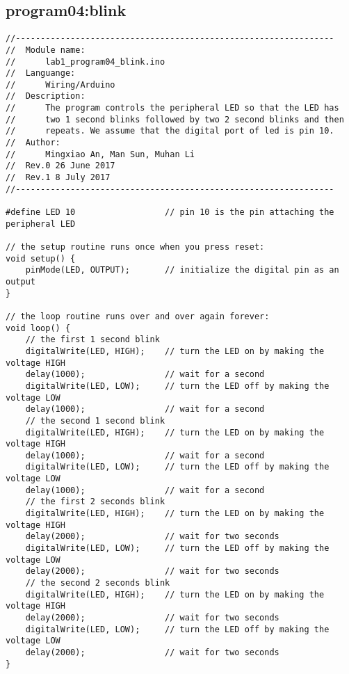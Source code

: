 \subsection{program04:blink}
\begin{verbatim}
//----------------------------------------------------------------
//  Module name:
//      lab1_program04_blink.ino
//  Languange:
//      Wiring/Arduino
//  Description:
//      The program controls the peripheral LED so that the LED has 
//      two 1 second blinks followed by two 2 second blinks and then
//      repeats. We assume that the digital port of led is pin 10.
//  Author:
//      Mingxiao An, Man Sun, Muhan Li
//  Rev.0 26 June 2017
//  Rev.1 8 July 2017
//----------------------------------------------------------------

#define LED 10                  // pin 10 is the pin attaching the peripheral LED

// the setup routine runs once when you press reset:
void setup() {
    pinMode(LED, OUTPUT);       // initialize the digital pin as an output
}

// the loop routine runs over and over again forever:
void loop() {
    // the first 1 second blink
    digitalWrite(LED, HIGH);    // turn the LED on by making the voltage HIGH
    delay(1000);                // wait for a second
    digitalWrite(LED, LOW);     // turn the LED off by making the voltage LOW
    delay(1000);                // wait for a second
    // the second 1 second blink
    digitalWrite(LED, HIGH);    // turn the LED on by making the voltage HIGH
    delay(1000);                // wait for a second
    digitalWrite(LED, LOW);     // turn the LED off by making the voltage LOW
    delay(1000);                // wait for a second
    // the first 2 seconds blink
    digitalWrite(LED, HIGH);    // turn the LED on by making the voltage HIGH
    delay(2000);                // wait for two seconds
    digitalWrite(LED, LOW);     // turn the LED off by making the voltage LOW
    delay(2000);                // wait for two seconds
    // the second 2 seconds blink
    digitalWrite(LED, HIGH);    // turn the LED on by making the voltage HIGH
    delay(2000);                // wait for two seconds
    digitalWrite(LED, LOW);     // turn the LED off by making the voltage LOW
    delay(2000);                // wait for two seconds
}
\end{verbatim}

